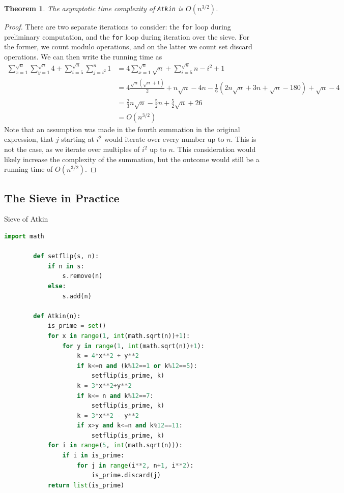\documentclass{amsart}
\newtheorem{thm}{Theorem}
\theoremstyle{definition}
\theoremstyle{case}
\begin{document}
	\begin{thm}
		The asymptotic time complexity of \texttt{Atkin} is $O(n^{3/2})$.
	\end{thm}
	\begin{proof}
		There are two separate iterations to consider: the \texttt{for} loop during preliminary computation, and the \texttt{for} loop during iteration over the sieve. For the former, we count modulo operations, and on the latter we count set discard operations. We can then write the running time as
		\begin{equation*}
		\begin{split}
		\sum_{x=1}^{\sqrt{n}} \sum_{y=1}^{\sqrt{n}} 4 + \sum_{i=5}^{\sqrt{n}} \sum_{j=i^2}^{n} 1 & = 4 \sum_{x=1}^{\sqrt{n}} \sqrt{n} + \sum_{i=5}^{\sqrt{n}} n - i^2 + 1 \\
		& = 4 \frac{\sqrt{n}(\sqrt{n}+1)}{2} + n\sqrt{n} - 4n - \frac{1}{6} (2n\sqrt{n} + 3n + \sqrt{n} - 180) + \sqrt{n} - 4 \\
		& = \frac{2}{3} n \sqrt{n} - \frac{5}{2} n + \frac{5}{2} \sqrt{n} + 26 \\
		& = O(n^{3/2})
		\end{split}
		\end{equation*}
		Note that an assumption was made in the fourth summation in the original expression, that $j$ starting at $i^2$ would iterate over every number up to $n$. This is not the case, as we iterate over multiples of $i^2$ up to $n$. This consideration would likely increase the complexity of the summation, but the outcome would still be a running time of $O(n^{3/2})$.
	\end{proof}
	
	\subsection{The Sieve in Practice}
	
	\begin{Algorithm}[H]\caption{Sieve of Atkin}
		\begin{lstlisting}[language=Python]
        import math
        
        def setflip(s, n):
            if n in s:
                s.remove(n)
            else:
                s.add(n)
        
        def Atkin(n):
            is_prime = set()
            for x in range(1, int(math.sqrt(n))+1):
                for y in range(1, int(math.sqrt(n))+1):
                    k = 4*x**2 + y**2
                    if k<=n and (k%12==1 or k%12==5):
                        setflip(is_prime, k)
                    k = 3*x**2+y**2
                    if k<= n and k%12==7:
                        setflip(is_prime, k)
                    k = 3*x**2 - y**2
                    if x>y and k<=n and k%12==11:
                        setflip(is_prime, k)
            for i in range(5, int(math.sqrt(n))):
                if i in is_prime:
                    for j in range(i**2, n+1, i**2):
                        is_prime.discard(j)
            return list(is_prime)
		\end{lstlisting}
	\end{Algorithm}
	
\end{document}
